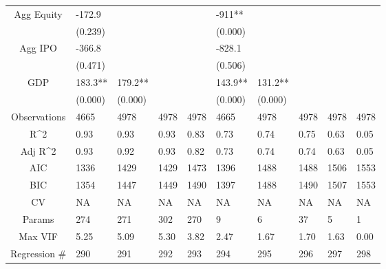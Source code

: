 \documentclass{article}
\begin{document}
\begin{table}[H]
\begin{tabular}{|clllllllll|}
  Agg Equity & -172.9 &  &  &  & -911** &  &  &  &  \\ 
   & (0.239) &  &  &  & (0.000) &  &  &  &  \\ 
  Agg IPO & -366.8 &  &  &  & -828.1 &  &  &  &  \\ 
   & (0.471) &  &  &  & (0.506) &  &  &  &  \\ 
  GDP & 183.3** & 179.2** &  &  & 143.9** & 131.2** &  &  &  \\ 
   & (0.000) & (0.000) &  &  & (0.000) & (0.000) &  &  &  \\ 
  \hline 
 Observations & 4665 & 4978 & 4978 & 4978 & 4665 & 4978 & 4978 & 4978 & 4978 \\ 
  R^2 & 0.93 & 0.93 & 0.93 & 0.83 & 0.73 & 0.74 & 0.75 & 0.63 & 0.05 \\ 
  Adj R^2 & 0.93 & 0.92 & 0.93 & 0.82 & 0.73 & 0.74 & 0.74 & 0.63 & 0.05 \\ 
  AIC & 1336 & 1429 & 1429 & 1473 & 1396 & 1488 & 1488 & 1506 & 1553 \\ 
  BIC & 1354 & 1447 & 1449 & 1490 & 1397 & 1488 & 1490 & 1507 & 1553 \\ 
  CV & NA & NA & NA & NA & NA & NA & NA & NA & NA \\ 
  Params & 274 & 271 & 302 & 270 & 9 & 6 & 37 & 5 & 1 \\ 
  Max VIF & 5.25 & 5.09 & 5.30 & 3.82 & 2.47 & 1.67 & 1.70 & 1.63 & 0.00 \\ 
  Regression \# & 290 & 291 & 292 & 293 & 294 & 295 & 296 & 297 & 298 \\ 
   \hline
\end{tabular}
 
\end{table}
\end{document}
